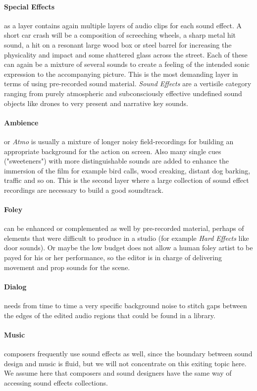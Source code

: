 \paragraph{Special Effects} as a layer contains again multiple layers of
audio clips for each sound effect. A short car crash will be a composition of
screeching wheels, a sharp metal hit sound, a hit on a resonant large
wood box or steel barrel for increasing the physicality and impact and
some shattered glass across the street. Each of these can again be a
mixture of several sounds to create a feeling of the intended sonic
expression to the accompanying picture. This is the most demanding
layer in terms of using pre-recorded sound material. \textit{Sound Effects} are a vertisile category ranging from purely atmospheric and subconsciously effective undefined sound objects like drones to very present and narrative key sounds.
\paragraph{Ambience} or \emph{Atmo} is usually a mixture of longer noisy
field-recordings for building an appropriate background for the action
on screen. Also many single cues ("sweeteners") with more
distinguishable sounds are added to enhance the immersion of the film
for example bird calls, wood creaking, distant dog barking, traffic and
so on. This is the second layer where a large collection of sound effect
recordings are necessary to build a good soundtrack. 
\vspace{-11pt}

\paragraph{Foley} can be enhanced or complemented as well by pre-recorded material, perhaps of elements that were difficult to produce in a studio (for example \textit{Hard Effects} like door sounds). Or maybe the low budget does not allow a human foley artist to be payed for his or
her performance, so the editor is in charge of delivering movement and prop
sounds for the scene.

\paragraph{Dialog} needs from time to time a very specific background noise
to stitch gaps between the edges of the edited audio regions that could
be found in a library.

\paragraph{Music} composers frequently use sound effects as well, since the
boundary between sound design and music is fluid, but we will not
concentrate on this exiting topic here. We assume here that composers
and sound designers have the same way of accessing sound effects
collections.

